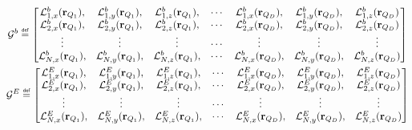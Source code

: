\begin{gather}
    \mathcal{G}^b \defeq
    \begin{bmatrix}
        \mathcal{L}_{1,x}^b(\mathbf{r}_{Q_1}), & \mathcal{L}_{1,y}^b(\mathbf{r}_{Q_1}), & \mathcal{L}_{1,z}^b(\mathbf{r}_{Q_1}), &
        \cdots &
        \mathcal{L}_{1,x}^b(\mathbf{r}_{Q_D}), & \mathcal{L}_{1,y}^b(\mathbf{r}_{Q_D}), & \mathcal{L}_{1,z}^b(\mathbf{r}_{Q_D}) \\
        \mathcal{L}_{2,x}^b(\mathbf{r}_{Q_1}), & \mathcal{L}_{2,y}^b(\mathbf{r}_{Q_1}), & \mathcal{L}_{2,z}^b(\mathbf{r}_{Q_1}), &
        \cdots &
        \mathcal{L}_{2,x}^b(\mathbf{r}_{Q_D}), & \mathcal{L}_{2,y}^b(\mathbf{r}_{Q_D}), & \mathcal{L}_{2,z}^b(\mathbf{r}_{Q_D}) \\
        \vdots                                 & \vdots                                 & \vdots                                 &
        \cdots &
        \vdots                                 &  \vdots                                & \vdots                                \\
        \mathcal{L}_{N,x}^b(\mathbf{r}_{Q_1}), & \mathcal{L}_{N,y}^b(\mathbf{r}_{Q_1}), & \mathcal{L}_{N,z}^b(\mathbf{r}_{Q_1}), &
        \cdots &
        \mathcal{L}_{N,x}^b(\mathbf{r}_{Q_D}), & \mathcal{L}_{N,y}^b(\mathbf{r}_{Q_D}), & \mathcal{L}_{N,z}^b(\mathbf{r}_{Q_D})
    \end{bmatrix}\\
    \mathcal{G}^E \defeq
    \begin{bmatrix}
        \mathcal{L}_{1,x}^E(\mathbf{r}_{Q_1}), & \mathcal{L}_{1,y}^E(\mathbf{r}_{Q_1}), & \mathcal{L}_{1,z}^E(\mathbf{r}_{Q_1}), &
        \cdots &
        \mathcal{L}_{1,x}^E(\mathbf{r}_{Q_D}), & \mathcal{L}_{1,y}^E(\mathbf{r}_{Q_D}), & \mathcal{L}_{1,z}^E(\mathbf{r}_{Q_D}) \\
        \mathcal{L}_{2,x}^E(\mathbf{r}_{Q_1}), & \mathcal{L}_{2,y}^E(\mathbf{r}_{Q_1}), & \mathcal{L}_{2,z}^E(\mathbf{r}_{Q_1}), &
        \cdots &
        \mathcal{L}_{2,x}^E(\mathbf{r}_{Q_D}), & \mathcal{L}_{2,y}^E(\mathbf{r}_{Q_D}), & \mathcal{L}_{2,z}^E(\mathbf{r}_{Q_D}) \\
        \vdots                                 & \vdots                                 & \vdots                                 &
        \cdots &
        \vdots                                 &  \vdots                                & \vdots                                \\
        \mathcal{L}_{N,x}^E(\mathbf{r}_{Q_1}), & \mathcal{L}_{N,y}^E(\mathbf{r}_{Q_1}), & \mathcal{L}_{N,z}^E(\mathbf{r}_{Q_1}), &
        \cdots &
        \mathcal{L}_{N,x}^E(\mathbf{r}_{Q_D}), & \mathcal{L}_{N,y}^E(\mathbf{r}_{Q_D}), & \mathcal{L}_{N,z}^E(\mathbf{r}_{Q_D})
    \end{bmatrix}
\end{gather}

